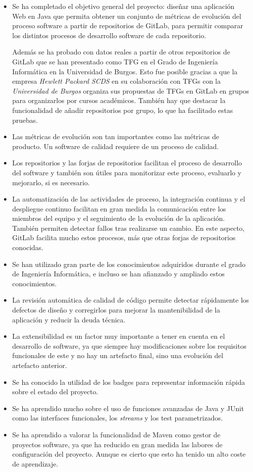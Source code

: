 \begin{itemize}
	\item Se ha completado el objetivo general del proyecto: diseñar una aplicación Web en Java que permita obtener un conjunto de métricas de evolución del proceso software \citep{ratzinger_space:_2007} a partir de repositorios de GitLab, para permitir comparar los distintos procesos de desarrollo software de cada repositorio. 
	
	Además se ha probado con datos reales a partir de otros repositorios de GitLab que se han presentado como TFG en el Grado de Ingeniería Informática en la Universidad de Burgos. Esto fue posible gracias a que la empresa \textit{Hewlett Packard SCDS} en su colaboración con TFGs con la \textit{Universidad de Burgos} organiza sus propuestas de TFGs en GitLab en grupos para organizarlos por cursos académicos. También hay que destacar la funcionalidad de añadir repositorios por grupo, lo que ha facilitado estas pruebas.
	
	\item Las métricas de evolución son tan importantes como las métricas de producto. Un software de calidad requiere de un proceso de calidad.
	\item Los repositorios y las forjas de repositorios facilitan el proceso de desarrollo del software y también son útiles para monitorizar este proceso, evaluarlo y mejorarlo, si es necesario.
	\item La automatización de las actividades de proceso, la integración continua y el despliegue continuo facilitan en gran medida la comunicación entre los miembros del equipo y el seguimiento de la evolución de la aplicación. También permiten detectar fallos tras realizarse un cambio. En este aspecto, GitLab facilita mucho estos procesos, más que otras forjas de repositorios conocidas.
	\item Se han utilizado gran parte de los conocimientos adquiridos durante el grado de Ingeniería Informática, e incluso se han afianzado y ampliado estos conocimientos.
	\item La revisión automática de calidad de código permite detectar rápidamente los defectos de diseño y corregirlos para mejorar la mantenibilidad de la aplicación y reducir la deuda técnica.
	\item La extensibilidad es un factor muy importante a tener en cuenta en el desarrollo de software, ya que siempre hay modificaciones sobre los requisitos funcionales de este y no hay un artefacto final, sino una evolución del artefacto anterior.
	\item Se ha conocido la utilidad de los badges para representar información rápida sobre el estado del proyecto.
	\item Se ha aprendido mucho sobre el uso de funciones avanzadas de Java y JUnit como las interfaces funcionales, los \textit{streams} y los test parametrizados.
	\item Se ha aprendido a valorar la funcionalidad de Maven como gestor de proyectos software, ya que ha reducido en gran medida las labores de configuración del proyecto. Aunque es cierto que esto ha tenido un alto coste de aprendizaje.
\end{itemize}

